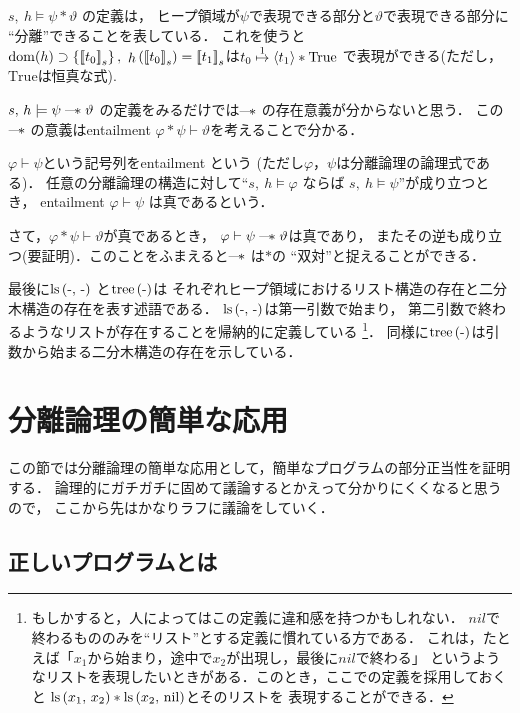 \documentclass[a4paper, 10pt]{ltjsarticle}
\begin{document}
$s{,}\ h \models \psi * \vartheta$ の定義は，
ヒープ領域が$\psi$で表現できる部分と$\vartheta$で表現できる部分に
``分離''できることを表している．
これを使うと 
$\mathdom{h} \supset \left\{ \mathLdoubleko t_0 \mathRdoubleko _{s}  \right\}{,}\ \mathop{h}\left(\mathLdoubleko t_0 \mathRdoubleko _{s}\right) = \mathLdoubleko t_1 \mathRdoubleko _{s}$は$t_0 \mathrel{\overset{1}{\mapsto}} \left\langle t_1 \right\rangle * \mathrm{True}$
で表現ができる(ただし，$\mathrm{True}$は恒真な式).

$s{,}\ h \models \psi \mathrel{\text{---}\!\!*} \vartheta$ 
の定義をみるだけでは$\mathrel{\text{---}\!\!*}$ の存在意義が分からないと思う．
この$\mathrel{\text{---}\!\!*}$ の意義はentailment 
$\varphi * \psi \vdash \vartheta $を考えることで分かる．

$\varphi \vdash \psi$という記号列をentailment という
(ただし$\varphi$，$\psi$は分離論理の論理式である)．
任意の分離論理の構造に対して``$s{,}\ h \models \varphi$ ならば 
$s{,}\ h \models \psi$''が成り立つとき，
entailment $\varphi \vdash \psi$ は真であるという．

さて，$\varphi * \psi \vdash \vartheta $が真であるとき，
$\varphi \vdash \psi \mathrel{\text{---}\!\!*} \vartheta $は真であり，
またその逆も成り立つ(要証明)．このことをふまえると$\mathrel{\text{---}\!\!*}$ は$*$の
``双対''と捉えることができる．

最後に$\mathprls{\mathdash}{\mathchar`-}$
と$\mathprtree{\mathdash}$は
それぞれヒープ領域におけるリスト構造の存在と二分木構造の存在を表す述語である．
$\mathprls{\mathdash}{\mathchar`-}$は第一引数で始まり，
第二引数で終わるようなリストが存在することを帰納的に定義している
\footnote{もしかすると，人によってはこの定義に違和感を持つかもしれない．
$nil$で終わるもののみを``リスト''とする定義に慣れている方である．
これは，たとえば「$x_1$から始まり，途中で$x_2$が出現し，最後に$nil$で終わる」
というようなリストを表現したいときがある．このとき，ここでの定義を採用しておくと
$\mathop{\mathrm{ls}}\left(x_1{,}\ x_2\right)*\mathop{\mathrm{ls}}\left(x_2{,}\ \mathrm{nil}\right)$とそのリストを
表現することができる．}．
同様に$\mathprtree{\mathdash}$は引数から始まる二分木構造の存在を示している．

 \section{分離論理の簡単な応用}
 この節では分離論理の簡単な応用として，簡単なプログラムの部分正当性を証明する．
 論理的にガチガチに固めて議論するとかえって分かりにくくなると思うので，
 ここから先はかなりラフに議論をしていく．

 \subsection{正しいプログラムとは}
\end{document}
